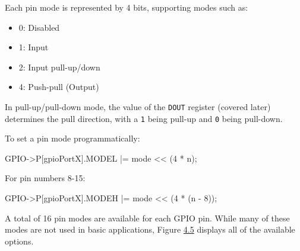 \documentclass[
  9pt,
  letterpaper,
  abstract,
  titlepage]{scrbook}
\newenvironment{Shaded}{\begin{snugshade}}{\end{snugshade}}
\newcommand{\DecValTok}[1]{\textcolor[rgb]{0.68,0.00,0.00}{#1}}
\newcommand{\NormalTok}[1]{\textcolor[rgb]{0.00,0.23,0.31}{#1}}
\newcommand{\OperatorTok}[1]{\textcolor[rgb]{0.37,0.37,0.37}{#1}}
\begin{document}
Each pin mode is represented by 4 bits, supporting modes such as:

\begin{itemize}
\item
  0: Disabled
\item
  1: Input
\item
  2: Input pull-up/down
\item
  4: Push-pull (Output)
\end{itemize}

In pull-up/pull-down mode, the value of the \texttt{DOUT} register
(covered later) determines the pull direction, with a \texttt{1} being
pull-up and \texttt{0} being pull-down.

To set a pin mode programmatically:

\begin{Shaded}
\begin{Highlighting}[]
\NormalTok{GPIO}\OperatorTok{{-}\textgreater{}}\NormalTok{P}\OperatorTok{[}\NormalTok{gpioPortX}\OperatorTok{].}\NormalTok{MODEL }\OperatorTok{|=}\NormalTok{ mode }\OperatorTok{\textless{}\textless{}} \OperatorTok{(}\DecValTok{4} \OperatorTok{*}\NormalTok{ n}\OperatorTok{);}
\end{Highlighting}
\end{Shaded}

For pin numbers 8-15:

\begin{Shaded}
\begin{Highlighting}[]
\NormalTok{GPIO}\OperatorTok{{-}\textgreater{}}\NormalTok{P}\OperatorTok{[}\NormalTok{gpioPortX}\OperatorTok{].}\NormalTok{MODEH }\OperatorTok{|=}\NormalTok{ mode }\OperatorTok{\textless{}\textless{}} \OperatorTok{(}\DecValTok{4} \OperatorTok{*} \OperatorTok{(}\NormalTok{n }\OperatorTok{{-}} \DecValTok{8}\OperatorTok{));}
\end{Highlighting}
\end{Shaded}

A total of 16 pin modes are available for each GPIO pin. While many of
these modes are not used in basic applications, Figure
\hyperref[fig:moden]{4.5} displays all of the available options.
\end{document}
